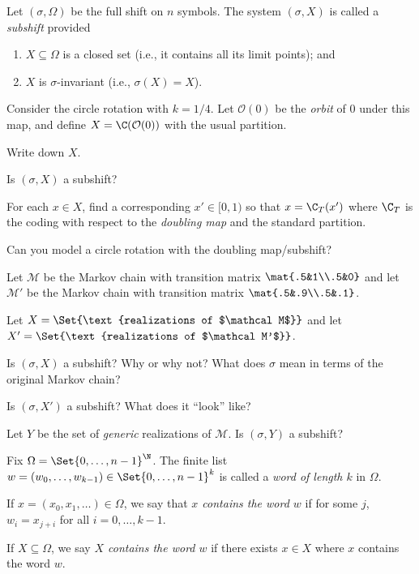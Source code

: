 	\begin{definition}[Subshift]
		Let $(\sigma,\Omega)$ be the full shift on $n$ symbols. The system $(\sigma, X)$ is
		called a \emph{subshift} provided
		\begin{enumerate}
			\item $X\subseteq \Omega$ is a closed set (i.e., it contains all its limit points); and
			\item $X$ is $\sigma$-invariant (i.e., $\sigma(X)=X$).
		\end{enumerate}
	\end{definition}

	\question
	Consider the circle rotation with $k=1/4$. Let $\mathcal O(0)$ be the \emph{orbit}
	of $0$ under this map, and define $X=\C(\mathcal O(0))$ with the usual partition.
	\begin{parts}
		\item Write down $X$.
		\item Is $(\sigma, X)$ a subshift?
		\item For each $x\in X$, find a corresponding $x'\in [0,1)$ so that
			$x=\C_T(x')$ where $\C_T$ is the coding with respect to the \emph{doubling map}
			and the standard partition.
		\item Can you model a circle rotation with the doubling map/subshift?
	\end{parts}

	\newpage
	\question
	Let $\mathcal M$ be the Markov chain with transition matrix $\mat{.5&1\\.5&0}$ and let
	$\mathcal M'$ be the Markov chain with transition matrix $\mat{.5&.9\\.5&.1}$.

	Let $X=\Set{\text{realizations of $\mathcal M$}}$ and let
	$X'=\Set{\text{realizations of $\mathcal M'$}}$.
	\begin{parts}
		\item Is $(\sigma, X)$ a subshift? Why or why not? What does $\sigma$ mean in terms of the original Markov chain?
		\item Is $(\sigma, X')$ a subshift? What does it ``look'' like?
		\item Let $Y$ be the set of \emph{generic} realizations of $\mathcal M$. Is $(\sigma, Y)$ a subshift?
	\end{parts}

	\newpage
	\begin{definition}[Word]
		Fix $\Omega=\Set{0,\ldots, n-1}^\N$.
		The finite list $w=(w_0,\ldots,w_{k-1})\in \Set{0,\ldots, n-1}^k$ is called a \emph{word of length $k$} in $\Omega$.

		If $x=(x_0,x_1,\ldots)\in \Omega$, we say that \emph{$x$ contains the word $w$} if for some $j$, 
		$w_i = x_{j+i}$ for all $i=0,\ldots,k-1$.

		If $X\subseteq \Omega$, we say \emph{$X$ contains the word $w$} if there exists $x\in X$ where
		$x$ contains the word $w$.
	\end{definition}

